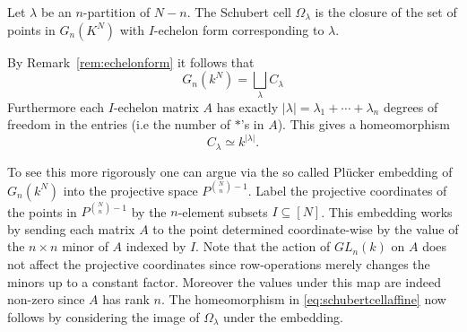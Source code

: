 \documentclass[a4paper,openany]{scrbook}
\begin{document}
\begin{defn}
Let $\lambda$ be an $n$-partition of $N-n$.
The Schubert cell $\Omega_{\lambda}$ is the closure of the set of points in $G_n(K^N)$ with $I$-echelon form corresponding to $\lambda$.
\end{defn} 

\begin{remark}
By Remark~\ref{rem:echelonform} it follows that
\[
G_n(k^N) = \bigsqcup_{\lambda} C_{\lambda}
\]
Furthermore each $I$-echelon matrix $A$ has exactly $|\lambda| = \lambda_1 + \cdots + \lambda_n$ degrees of freedom in the entries (i.e the number of $*$'s in $A$). This gives a homeomorphism 
\begin{equation}\label{eq:schubertcellaffine}
C_{\lambda} \simeq k^{|\lambda|}.
\end{equation}

To see this more rigorously one can argue via the so called Pl\"ucker embedding of $G_n(k^N)$ into the projective space $P^{\binom{N}{n} - 1}$. Label the projective coordinates of the points in $P^{\binom{N}{n} - 1}$ by the $n$-element subsets $I \subseteq [N]$. This embedding works by sending each matrix $A$ to the point determined coordinate-wise by the value of the $n \times n$ minor of $A$ indexed by $I$. Note that the action of $GL_n(k)$ on $A$ does not affect the projective coordinates since row-operations merely changes the minors up to a constant factor. Moreover the values under this map are indeed non-zero since $A$ has rank $n$. The homeomorphism in \ref{eq:schubertcellaffine} now follows by considering the image of $\Omega_{\lambda}$ under the embedding. 

\end{remark}
\end{document}
